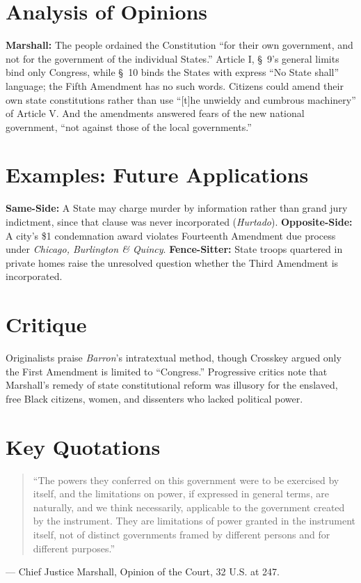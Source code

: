 \documentclass[12pt]{article}
\begin{document}
\section{Analysis of Opinions}
\textbf{Marshall:} The people ordained the Constitution ``for their own government, and not for the government of the individual States.'' Article I, \S~9's general limits bind only Congress, while \S~10 binds the States with express ``No State shall'' language; the Fifth Amendment has no such words. Citizens could amend their own state constitutions rather than use ``[t]he unwieldy and cumbrous machinery'' of Article V. And the amendments answered fears of the new national government, ``not against those of the local governments.''

\section{Examples: Future Applications}
\textbf{Same-Side:} A State may charge murder by information rather than grand jury indictment, since that clause was never incorporated (\textit{Hurtado}). \textbf{Opposite-Side:} A city's \$1 condemnation award violates Fourteenth Amendment due process under \textit{Chicago, Burlington \& Quincy}. \textbf{Fence-Sitter:} State troops quartered in private homes raise the unresolved question whether the Third Amendment is incorporated.

\section{Critique}
Originalists praise \textit{Barron}'s intratextual method, though Crosskey argued only the First Amendment is limited to ``Congress.'' Progressive critics note that Marshall's remedy of state constitutional reform was illusory for the enslaved, free Black citizens, women, and dissenters who lacked political power.

\section{Key Quotations}
\begin{quote}
``The powers they conferred on this government were to be exercised by itself, and the limitations on power, if expressed in general terms, are naturally, and we think necessarily, applicable to the government created by the instrument. They are limitations of power granted in the instrument itself, not of distinct governments framed by different persons and for different purposes.''
\end{quote}
\noindent --- Chief Justice Marshall, Opinion of the Court, 32 U.S. at 247.
\end{document}
